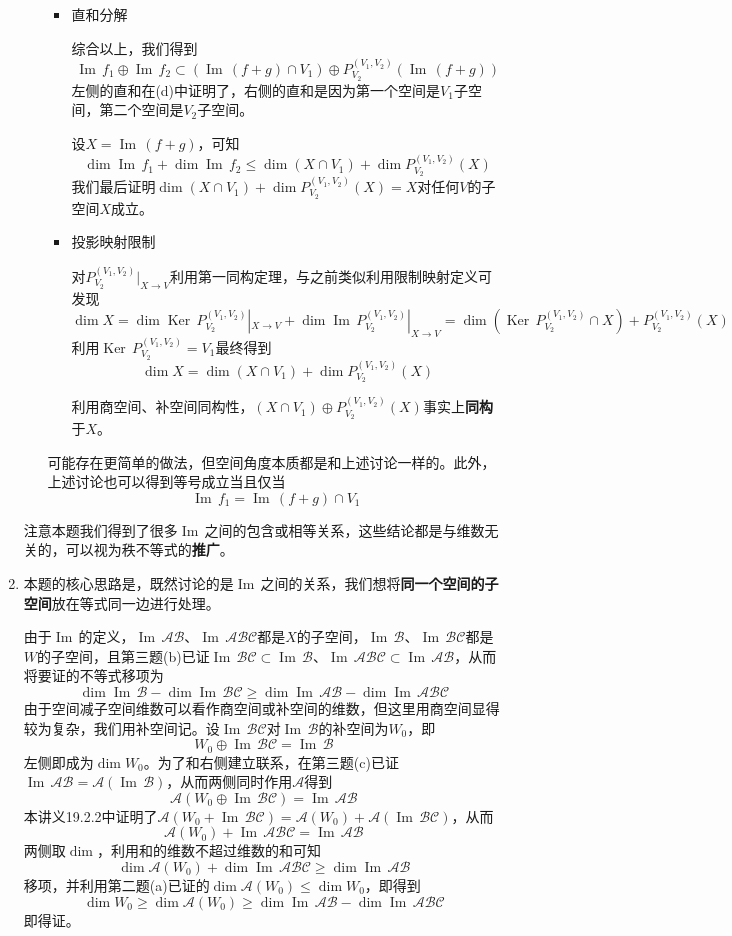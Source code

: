\documentclass[a4paper,UTF8,fontset=windows,AutoFakeBold]{ctexart}
\DeclareMathOperator{\im}{Im\,}
\DeclareMathOperator{\Ker}{Ker\,}
\newcommand*{\ma}{\mathcal{A}}
\newcommand*{\mb}{\mathcal{B}}
\newcommand*{\mc}{\mathcal{C}}
\newcommand*{\note}{\noindent *}
\begin{document}
\begin{enumerate}
\begin{enumerate}
\begin{itemize}
            \item 直和分解

            综合以上，我们得到
            $$\im f_1\oplus\im f_2\subset(\im(f+g)\cap V_1)\oplus P_{V_2}^{(V_1,V_2)}(\im(f+g))$$
            左侧的直和在(d)中证明了，右侧的直和是因为第一个空间是$V_1$子空间，第二个空间是$V_2$子空间。

            设$X=\im(f+g)$，可知
            $$\dim\im f_1+\dim\im f_2\le\dim(X\cap V_1)+\dim P_{V_2}^{(V_1,V_2)}(X)$$
            我们最后证明$\dim(X\cap V_1)+\dim P_{V_2}^{(V_1,V_2)}(X)=X$对任何$V$的子空间$X$成立。

            \item 投影映射限制
            
            对$P_{V_2}^{(V_1,V_2)}|_{X\to V}$利用第一同构定理，与之前类似利用限制映射定义可发现
            $$\dim X=\dim\Ker P_{V_2}^{(V_1,V_2)}|_{X\to V}+\dim\im P_{V_2}^{(V_1,V_2)}|_{X\to V}=\dim(\Ker P_{V_2}^{(V_1,V_2)}\cap X)+P_{V_2}^{(V_1,V_2)}(X)$$
            利用$\Ker P_{V_2}^{(V_1,V_2)}=V_1$最终得到
            $$\dim X=\dim(X\cap V_1)+\dim P_{V_2}^{(V_1,V_2)}(X)$$
            
            \note 利用商空间、补空间同构性，$(X\cap V_1)\oplus P_{V_2}^{(V_1,V_2)}(X)$事实上\textbf{同构}于$X$。
        \end{itemize}
        
        \note 可能存在更简单的做法，但空间角度本质都是和上述讨论一样的。此外，上述讨论也可以得到等号成立当且仅当
        $$\im f_1=\im(f+g)\cap V_1$$

    \end{enumerate}
    \note 注意本题我们得到了很多$\im$之间的包含或相等关系，这些结论都是与维数无关的，可以视为秩不等式的\textbf{推广}。

    \item
    本题的核心思路是，既然讨论的是$\im$之间的关系，我们想将\textbf{同一个空间的子空间}放在等式同一边进行处理。

    由于$\im$的定义，$\im\ma\mb$、$\im\ma\mb\mc$都是$X$的子空间，$\im\mb$、$\im\mb\mc$都是$W$的子空间，且第三题(b)已证$\im\mb\mc\subset\im\mb$、$\im\ma\mb\mc\subset\im\ma\mb$，从而将要证的不等式移项为
    $$\dim\im\mb-\dim\im\mb\mc\ge\dim\im\ma\mb-\dim\im\ma\mb\mc$$
    由于空间减子空间维数可以看作商空间或补空间的维数，但这里用商空间显得较为复杂，我们用补空间记。设$\im\mb\mc$对$\im\mb$的补空间为$W_0$，即
    $$W_0\oplus\im\mb\mc=\im\mb$$
    左侧即成为$\dim W_0$。为了和右侧建立联系，在第三题(c)已证$\im\ma\mb=\ma(\im\mb)$，从而两侧同时作用$\ma$得到
    $$\ma(W_0\oplus\im\mb\mc)=\im\ma\mb$$
    本讲义19.2.2中证明了$\ma(W_0+\im\mb\mc)=\ma(W_0)+\ma(\im\mb\mc)$，从而
    $$\ma(W_0)+\im\ma\mb\mc=\im\ma\mb$$
    两侧取$\dim$，利用和的维数不超过维数的和可知
    $$\dim\ma(W_0)+\dim\im\ma\mb\mc\ge\dim\im\ma\mb$$
    移项，并利用第二题(a)已证的$\dim\ma(W_0)\le\dim W_0$，即得到
    $$\dim W_0\ge\dim\ma(W_0)\ge\dim\im\ma\mb-\dim\im\ma\mb\mc$$
    即得证。


\end{enumerate}
\end{document}
